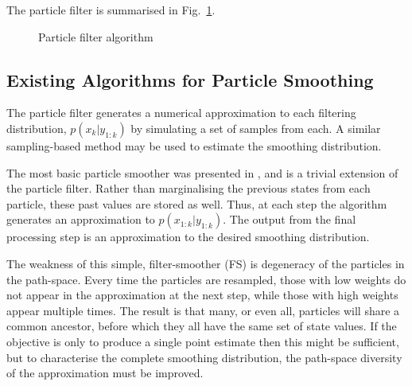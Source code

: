 \documentclass[journal]{IEEEtran}
\begin{document}
The particle filter is summarised in Fig.~\ref{alg:PF}.

\begin{figure}
\caption{Particle filter algorithm}
\label{alg:PF}
\end{figure}

\subsection{Existing Algorithms for Particle Smoothing }

The particle filter generates a numerical approximation to each filtering distribution, $p(x_k|y_{1:k})$ by simulating a set of samples from each. A similar sampling-based method may be used to estimate the smoothing distribution.

The most basic particle smoother was presented in \cite{Kitagawa1996}, and is a trivial extension of the particle filter. Rather than marginalising the previous states from each particle, these past values are stored as well. Thus, at each step the algorithm generates an approximation to $p(x_{1:k}|y_{1:k})$. The output from the final processing step is an approximation to the desired smoothing distribution.

The weakness of this simple, filter-smoother (FS) is degeneracy of the particles in the path-space. Every time the particles are resampled, those with low weights do not appear in the approximation at the next step, while those with high weights appear multiple times. The result is that many, or even all, particles will share a common ancestor, before which they all have the same set of state values. If the objective is only to produce a single point estimate then this might be sufficient, but to characterise the complete smoothing distribution, the path-space diversity of the approximation must be improved.
\end{document}
